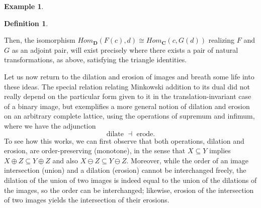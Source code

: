 \documentclass[a4paper]{book}
\theoremstyle{definition}
\newtheorem{example}{Example}[section]
\theoremstyle{definition}
\newtheorem{definition}{Definition}[section]
\theoremstyle{definition}
\theoremstyle{theorem}
\theoremstyle{definition}
\begin{document}
\begin{example}
\begin{definition}
	\begin{center}
	\end{center}  
\end{definition} \noindent 
Then, the isomorphism $Hom_{\textbf{D}}(F(c), d) \cong Hom_{\textbf{C}}(c, G(d))$ realizing $F$ and $G$ as an adjoint pair, will exist precisely where there exists a pair of natural transformations, as above, satisfying the triangle identities.\par \vspace*{1em} 
	Let us now return to the dilation and erosion of images and breath some life into these ideas. The special relation relating Minkowski addition to its dual did not really depend on the particular form given to it in the translation-invariant case of a binary image, but exemplifies a more general notion of dilation and erosion on an arbitrary complete lattice, using the operations of supremum and infimum, where we have the adjunction
	\begin{equation*}
	\text{dilate } \dashv \text{ erode}. 
	\end{equation*}
	 To see how this works, we can first observe that both operations, dilation and erosion, are order-preserving (monotone), in the sense that $X \subseteq  Y$ implies $X \oplus Z \subseteq  Y \oplus Z$ and also $X \ominus Z \subseteq  Y \ominus Z$. Moreover, while the order of an image intersection (union) and a dilation (erosion) cannot be interchanged freely, the dilation of the union of two images is indeed equal to the union of the dilations of the images, so the order can be interchanged; likewise, erosion of the intersection of two images yields the intersection of their erosions. \par 

\end{example}
\end{document}
